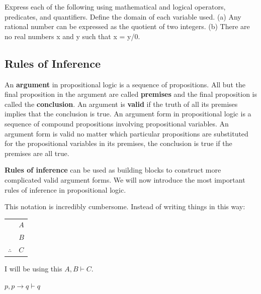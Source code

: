 \begin{exmp}
Express each of the following using mathematical and logical operators,
predicates, and quantifiers. Define the domain of each variable used.
(a) Any rational number can be expressed as the quotient of two integers.
(b) There are no real numbers x and y such that x = y/0.

\end{exmp}
\vspace{3cm}

\newpage
\subsection{Rules of Inference}
\begin{defn}[]
An \textbf{argument} in propositional logic is a sequence of propositions. All but the final proposition
in the argument are called \textbf{premises} and the final proposition is called the \textbf{conclusion}. An
argument is \textbf{valid} if the truth of all its premises implies that the conclusion is true.
An argument form in propositional logic is a sequence of compound propositions involving
propositional variables. An argument form is valid no matter which particular propositions
are substituted for the propositional variables in its premises, the conclusion is true if
the premises are all true.
\end{defn}
\begin{defn}
\textbf{Rules of inference} can be used as building blocks to construct more complicated valid argument forms.
We will now introduce the most important rules of inference in propositional logic.
\end{defn}
This notation is incredibly cumbersome. Instead of writing things in this way:
\begin{tabular}{cl}
    & $A$\\
    & $B$\\
    \hline
    $\therefore$ & $C$
  \end{tabular}
I will be using this
$A,B \vdash C$.

\begin{defn}
$p,p\to q \vdash q$
\end{defn}

